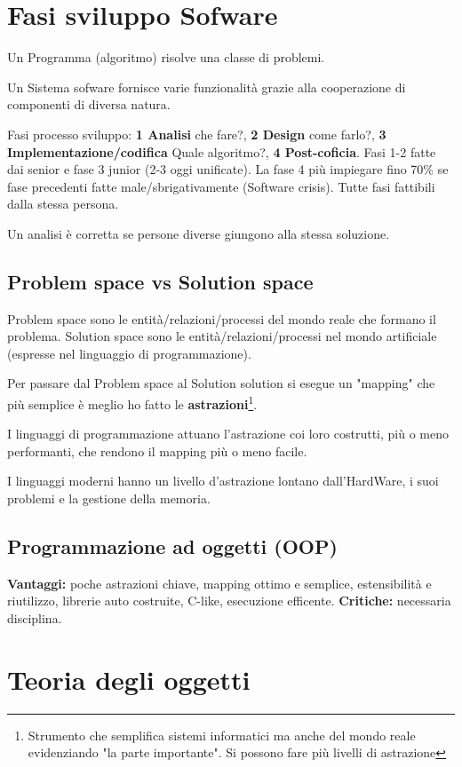 \section{Fasi sviluppo Sofware}
Un Programma (algoritmo) risolve una classe di problemi.

Un Sistema sofware fornisce varie funzionalità grazie alla cooperazione di componenti di diversa natura.

Fasi processo sviluppo: \textbf{1 Analisi} che fare?, \textbf{2 Design} come farlo?, \textbf{3 Implementazione/codifica} Quale algoritmo?, \textbf{4 Post-coficia}.
Fasi 1-2 fatte dai senior e fase 3 junior (2-3 oggi unificate). La fase 4 più impiegare fino 70\% se fase precedenti fatte male/sbrigativamente (Software crisis).
Tutte fasi fattibili dalla stessa persona.

Un analisi è corretta se persone diverse giungono alla stessa soluzione.

\subsection{Problem space vs Solution space}
Problem space sono le entità/relazioni/processi del mondo reale che formano il problema. Solution space sono le entità/relazioni/processi nel mondo artificiale (espresse nel linguaggio di programmazione).

Per passare dal Problem space al Solution solution si esegue un "mapping" che più semplice è meglio ho fatto le \textbf{astrazioni}\footnote{Strumento che semplifica sistemi informatici ma anche del mondo reale evidenziando "la parte importante". Si possono fare più livelli di astrazione}.

I linguaggi di programmazione attuano l'astrazione coi loro costrutti, più o meno performanti, che rendono il mapping più o meno facile.

I linguaggi moderni hanno un livello d'astrazione lontano dall'HardWare, i suoi problemi e la gestione della memoria.

\subsection{Programmazione ad oggetti (OOP)}
\textbf{Vantaggi:} poche astrazioni chiave, mapping ottimo e semplice, estensibilità e riutilizzo, librerie auto costruite, C-like, esecuzione efficente. \textbf{Critiche:} necessaria disciplina.

\section{Teoria degli oggetti}

